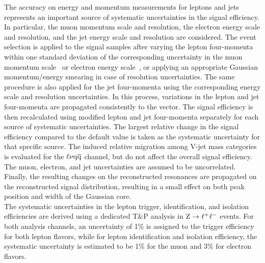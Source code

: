 The accuracy on energy and momentum measurements for leptons and jets represents an important source of systematic uncertainties in the signal efficiency.
In particular, the muon momentum scale and resolution, the electron energy scale and resolution, and the jet energy scale and resolution are considered.
The event selection is applied to the signal samples after varying the lepton four-momenta within one standard deviation of the corresponding uncertainty
in the muon momentum scale~\cite{Chatrchyan:2012xi} or electron energy scale~\cite{Chatrchyan:2013dga}, or applying an appropriate Gaussian momentum/energy smearing in case of resolution uncertainties.
The same procedure is also applied for the jet four-momenta using the corresponding energy scale and resolution uncertainties.
In this process, variations in the lepton and jet four-momenta are propagated consistently to the \ptvecmiss vector.
The signal efficiency is then recalculated using modified lepton and jet four-momenta separately for each source of systematic uncertainties.
The largest relative change in the signal efficiency compared to the default value is taken as the systematic uncertainty for that specific source.
The induced relative migration among V-jet mass categories is evaluated for the $\ell\nu\mathrm{q}\overline{\mathrm{q}}$ channel, but do not affect the overall signal efficiency. The muon, electron, and jet uncertainties are assumed to be uncorrelated. 
Finally, the resulting changes on the reconstructed resonances are propagated on the reconstructed \mlvj signal distribution, resulting in a small effect on both peak position and width of the Gaussian core.\\ 

The systematic uncertainties in the lepton trigger, identification, and isolation efficiencies are derived using a dedicated T\&P analysis in $\mathrm{Z}\rightarrow\ell^+\ell^-$ events.
For both analysis channels, an uncertainty of 1\% is assigned to the trigger efficiency for both lepton flavors,
while for lepton identification and isolation efficiency, the systematic uncertainty is estimated to be 1\% for the muon and 3\% for electron flavors.\\

